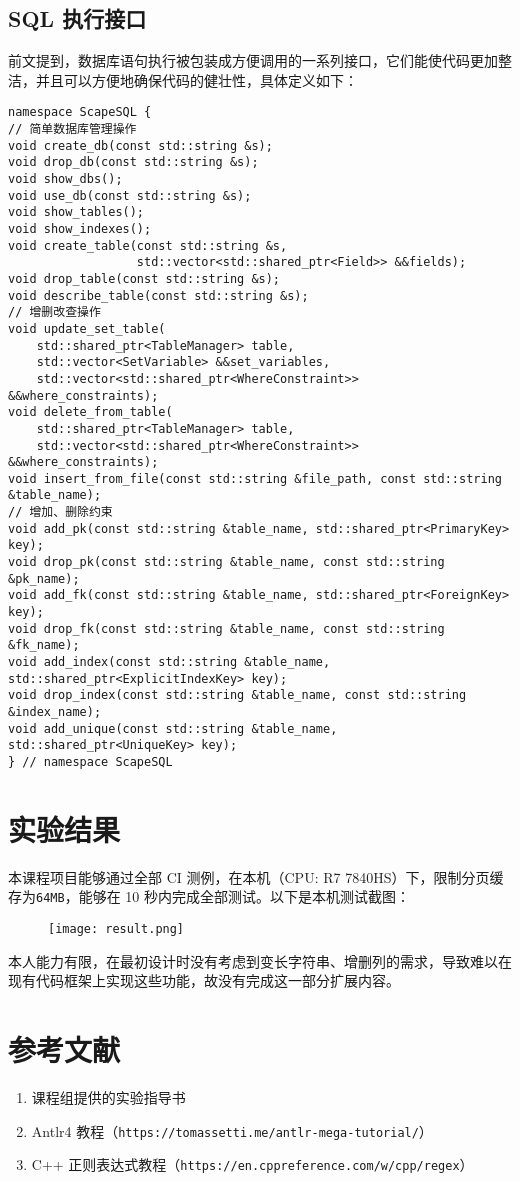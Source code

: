 \documentclass{ctexart}
\begin{document}
\subsection{SQL 执行接口}
前文提到，数据库语句执行被包装成方便调用的一系列接口，它们能使代码更加整洁，并且可以方便地确保代码的健壮性，具体定义如下：
\begin{mdframed}
	\begin{verbatim}
namespace ScapeSQL {
// 简单数据库管理操作
void create_db(const std::string &s);
void drop_db(const std::string &s);
void show_dbs();
void use_db(const std::string &s);
void show_tables();
void show_indexes();
void create_table(const std::string &s,
                  std::vector<std::shared_ptr<Field>> &&fields);
void drop_table(const std::string &s);
void describe_table(const std::string &s);
// 增删改查操作
void update_set_table(
    std::shared_ptr<TableManager> table,
    std::vector<SetVariable> &&set_variables,
    std::vector<std::shared_ptr<WhereConstraint>> &&where_constraints);
void delete_from_table(
    std::shared_ptr<TableManager> table,
    std::vector<std::shared_ptr<WhereConstraint>> &&where_constraints);
void insert_from_file(const std::string &file_path, const std::string &table_name);
// 增加、删除约束
void add_pk(const std::string &table_name, std::shared_ptr<PrimaryKey> key);
void drop_pk(const std::string &table_name, const std::string &pk_name);
void add_fk(const std::string &table_name, std::shared_ptr<ForeignKey> key);
void drop_fk(const std::string &table_name, const std::string &fk_name);
void add_index(const std::string &table_name, std::shared_ptr<ExplicitIndexKey> key);
void drop_index(const std::string &table_name, const std::string &index_name);
void add_unique(const std::string &table_name, std::shared_ptr<UniqueKey> key);
} // namespace ScapeSQL
\end{verbatim}
\end{mdframed}

\section{实验结果}
本课程项目能够通过全部 CI 测例，在本机（CPU: R7 7840HS）下，限制分页缓存为\texttt{64MB}，能够在 10 秒内完成全部测试。以下是本机测试截图：
\begin{figure}[htbp]
  \centering
  \texttt{[image: result.png]}
\end{figure}

本人能力有限，在最初设计时没有考虑到变长字符串、增删列的需求，导致难以在现有代码框架上实现这些功能，故没有完成这一部分扩展内容。

\section{参考文献}
\begin{enumerate}
  \item 课程组提供的实验指导书
  \item Antlr4 教程（\texttt{https://tomassetti.me/antlr-mega-tutorial/}）
  \item C++ 正则表达式教程（\texttt{https://en.cppreference.com/w/cpp/regex}）
\end{enumerate}
\end{document}
